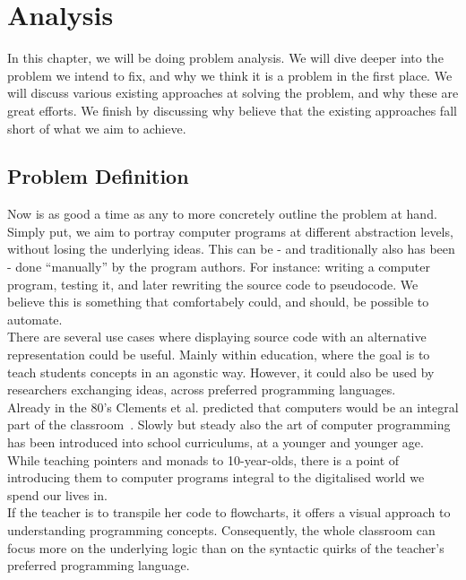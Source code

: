 \chapter{Analysis}

In this chapter, we will be doing problem analysis. We will dive deeper into the problem we intend to fix, and why we think it is a problem in the first place. We will discuss various existing approaches at solving the problem, and why these are great efforts. We finish by discussing why believe that the existing approaches fall short of what we aim to achieve.

\section{Problem Definition}

Now is as good a time as any to more concretely outline the problem at hand. Simply put, we aim to portray computer programs at different abstraction levels, without losing the underlying ideas. This can be - and traditionally also has been - done ``manually'' by the program authors. For instance: writing a computer program, testing it, and later rewriting the source code to pseudocode. We believe this is something that comfortabely could, and should, be possible to automate. \hfill \\

There are several use cases where displaying source code with an alternative representation could be useful. Mainly within education, where the goal is to teach students concepts in an agonstic way. However, it could also be used by researchers exchanging ideas, across preferred programming languages. \hfill \\

Already in the 80's Clements et al. predicted that computers would be an integral part of the classroom~\cite{clements1984effects}. Slowly but steady also the art of computer programming has been introduced into school curriculums, at a younger and younger age. While teaching pointers and monads to 10-year-olds, there is a point of introducing them to computer programs integral to the digitalised world we spend our lives in. \hfill \\

If the teacher is to transpile her code to flowcharts, it offers a visual approach to understanding programming concepts. Consequently, the whole classroom can focus more on the underlying logic than on the syntactic quirks of the teacher's preferred programming language. \hfill \\ %


